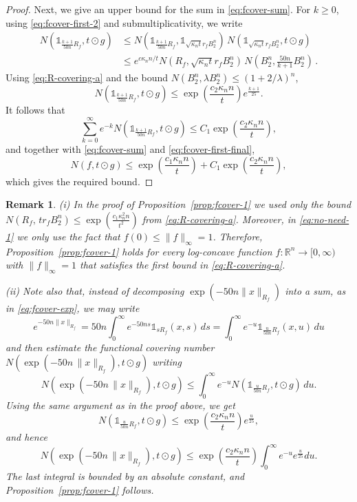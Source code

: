 \documentclass[11pt,leqno]{article}
\newtheorem{remark}[theorem]{Remark}
\theoremstyle{definition}
\theoremstyle{remark}
\numberwithin{equation}{section}
\newcommand{\ls}{\leqslant}
\newcommand{\gr}{\geqslant}
\begin{document}
\begin{proof}
Next, we give an upper bound for the sum in \eqref{eq:fcover-sum}. For $k\gr 0$, using \eqref{eq:fcover-first-2}
and submultiplicativity, we write
\begin{align*}N(\mathds{1}_{\frac{k+1}{50n}R_f},t\odot g) &\ls N(\mathds{1}_{\frac{k+1}{50n}R_f},\mathds{1}_{\sqrt{\kappa_nt}r_f B_2^n})
\,N(\mathds{1}_{\sqrt{\kappa_nt}r_f B_2^n},t\odot g)\\
&\ls e^{c\kappa_nn/t} N(R_f,\sqrt{\kappa_nt}r_f B_2^n)\,N\!\left(B_2^n,\tfrac{50n}{k+1}B_2^n\right)\,.
\end{align*}
Using \eqref{eq:R-covering-a} and the bound $N(B_2^n,\lambda B_2^n)\ls (1+2/\lambda)^n$,
$$N(\mathds{1}_{\frac{k+1}{50n}R_f},t\odot g)\ls \exp\!\left(\frac{c_2\kappa_n n}{t}\right)e^{\frac{k+1}{25}}.$$
It follows that
$$\sum_{k=0}^\infty e^{-k}N(\mathds{1}_{\frac{k+1}{50n}R_f},t\odot g)\ls 
C_1\exp\!\left(\frac{c_2\kappa_nn}{t}\right),$$
and together with \eqref{eq:fcover-sum} and \eqref{eq:fcover-first-final},
$$N(f,t\odot g)\ls \exp\!\left(\frac{c_1\kappa_n n}{t}\right)
+C_1\exp\!\left(\frac{c_2\kappa_n n}{t}\right),$$
which gives the required bound.
\end{proof}

\begin{remark}\label{rem:fcover-1}\rm (i) In the proof of Proposition~\ref{prop:fcover-1} we used only the bound
$N(R_f,\, t r_f B_2^n)\ls \exp\left( \tfrac{c_1 \kappa_n^2 n}{t^2}\right)$ from \eqref{eq:R-covering-a}.
Moreover, in \eqref{eq:no-need-1} we only use the fact that $f(0)\ls\|f\|_{\infty}=1$. Therefore,
Proposition~\ref{prop:fcover-1} holds for every log-concave function $f:\mathbb{R}^n\to[0,\infty)$ with $\|f\|_{\infty}=1$
that satisfies the first bound in \eqref{eq:R-covering-a}.

\smallskip 

(ii) Note also that, instead of decomposing $\exp(-50n\|x\|_{R_f})$ into a sum, as in \eqref{eq:fcover-exp}, we may write
$$e^{-50n\|x\|_{R_f}}=50n\int_0^{\infty}e^{-50ns}\mathds{1}_{sR_f}(x,s)\,ds=\int_0^{\infty}e^{-u}\mathds{1}_{\frac{u}{50n}R_f}(x,u)\,du$$
and then estimate the functional covering number $N(\exp(-50n\,\|x\|_{R_f}),t\odot g)$ writing
$$N(\exp(-50n\,\|x\|_{R_f}),t\odot g)\ls \int_0^{\infty}e^{-u}N(\mathds{1}_{\frac{u}{50n}R_f},t\odot g)\,du.$$
Using the same argument as in the proof above, we get
$$N(\mathds{1}_{\frac{u}{50n}R_f},t\odot g)\ls \exp\!\left(\frac{c_2\kappa_n n}{t}\right)e^{\frac{u}{25}},$$
and hence
$$N(\exp(-50n\,\|x\|_{R_f}),t\odot g)\ls \exp\!\left(\frac{c_2\kappa_n n}{t}\right)\int_0^{\infty}e^{-u}e^{\frac{u}{25}}du.$$
The last integral is bounded by an absolute constant, and Proposition~\ref{prop:fcover-1} follows.
\end{remark}
\end{document}
